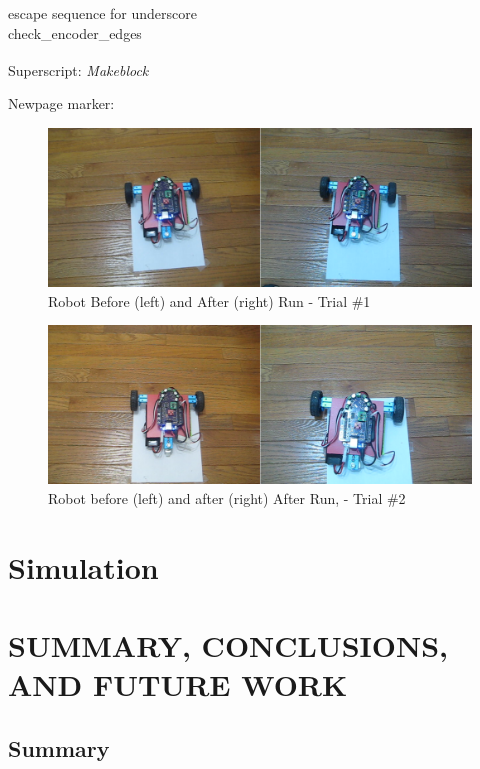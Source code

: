 \documentclass[12pt,oneside,final]{siuethesis}
\theoremstyle{definition}
\begin{document}
escape sequence for underscore \\
check\_encoder\_edges 

Superscript: \emph{Makeblock}\textsuperscript{\textregistered}

Newpage marker:

\newpage
\begin{figure}[!t]
 \centering
 \includegraphics[scale=.35,keepaspectratio=true]{./images/robot-test1.png}
 \caption{Robot Before (left) and After (right) Run - Trial \#1}
 \label{fig:robottest1}
\end{figure}

\begin{figure}[!t]
 \centering
 \includegraphics[scale=.35,keepaspectratio=true]{./images/robot-test2.png}
 \caption{Robot before (left) and after (right) After Run, - Trial \#2}
 \label{fig:robottest2}
\end{figure}

\chapter{Simulation}

\chapter{SUMMARY, CONCLUSIONS, AND FUTURE WORK}

\section{Summary}
\end{document}
